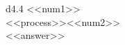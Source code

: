 
\begin{tabular}{d{4.4}}
    <<num1>> \\
    <<process>>\enspace<<num2>> \\
    \hline
    <<answer>> \\
    \hline\\
\end{tabular}
